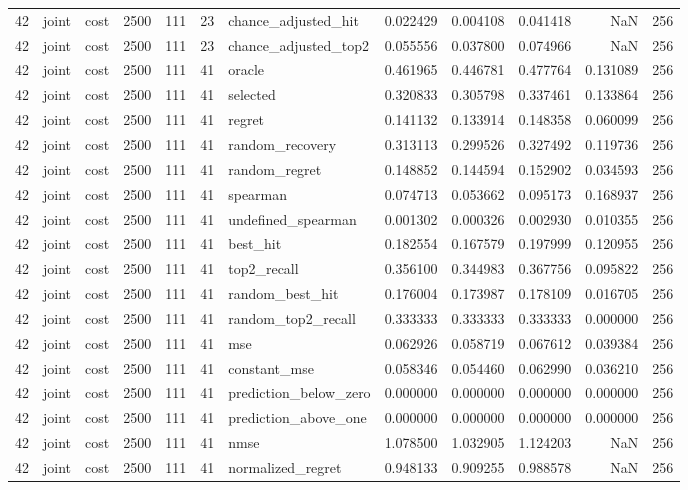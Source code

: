 \begin{tabular}{rllrrrlrrrrr}
42 & joint & cost & 2500 & 111 & 23 & chance_adjusted_hit & 0.022429 & 0.004108 & 0.041418 & NaN & 256 \\
42 & joint & cost & 2500 & 111 & 23 & chance_adjusted_top2 & 0.055556 & 0.037800 & 0.074966 & NaN & 256 \\
42 & joint & cost & 2500 & 111 & 41 & oracle & 0.461965 & 0.446781 & 0.477764 & 0.131089 & 256 \\
42 & joint & cost & 2500 & 111 & 41 & selected & 0.320833 & 0.305798 & 0.337461 & 0.133864 & 256 \\
42 & joint & cost & 2500 & 111 & 41 & regret & 0.141132 & 0.133914 & 0.148358 & 0.060099 & 256 \\
42 & joint & cost & 2500 & 111 & 41 & random_recovery & 0.313113 & 0.299526 & 0.327492 & 0.119736 & 256 \\
42 & joint & cost & 2500 & 111 & 41 & random_regret & 0.148852 & 0.144594 & 0.152902 & 0.034593 & 256 \\
42 & joint & cost & 2500 & 111 & 41 & spearman & 0.074713 & 0.053662 & 0.095173 & 0.168937 & 256 \\
42 & joint & cost & 2500 & 111 & 41 & undefined_spearman & 0.001302 & 0.000326 & 0.002930 & 0.010355 & 256 \\
42 & joint & cost & 2500 & 111 & 41 & best_hit & 0.182554 & 0.167579 & 0.197999 & 0.120955 & 256 \\
42 & joint & cost & 2500 & 111 & 41 & top2_recall & 0.356100 & 0.344983 & 0.367756 & 0.095822 & 256 \\
42 & joint & cost & 2500 & 111 & 41 & random_best_hit & 0.176004 & 0.173987 & 0.178109 & 0.016705 & 256 \\
42 & joint & cost & 2500 & 111 & 41 & random_top2_recall & 0.333333 & 0.333333 & 0.333333 & 0.000000 & 256 \\
42 & joint & cost & 2500 & 111 & 41 & mse & 0.062926 & 0.058719 & 0.067612 & 0.039384 & 256 \\
42 & joint & cost & 2500 & 111 & 41 & constant_mse & 0.058346 & 0.054460 & 0.062990 & 0.036210 & 256 \\
42 & joint & cost & 2500 & 111 & 41 & prediction_below_zero & 0.000000 & 0.000000 & 0.000000 & 0.000000 & 256 \\
42 & joint & cost & 2500 & 111 & 41 & prediction_above_one & 0.000000 & 0.000000 & 0.000000 & 0.000000 & 256 \\
42 & joint & cost & 2500 & 111 & 41 & nmse & 1.078500 & 1.032905 & 1.124203 & NaN & 256 \\
42 & joint & cost & 2500 & 111 & 41 & normalized_regret & 0.948133 & 0.909255 & 0.988578 & NaN & 256 \\

\end{tabular}
